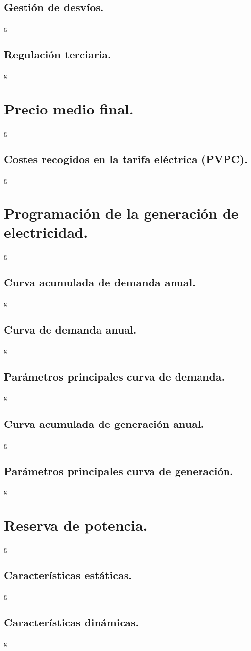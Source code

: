 \subsection{Gestión de desvíos.}
g
\subsection{Regulación terciaria.}
g
\section{Precio medio final.}
g
\subsection{Costes recogidos en la tarifa eléctrica (PVPC).}
g
\section{Programación de la generación de electricidad.}
g
\subsection{Curva acumulada de demanda anual.}
g
\subsection{Curva de demanda anual.}
g
\subsection{Parámetros principales curva de demanda.}
g
\subsection{Curva acumulada de generación anual.}
g
\subsection{Parámetros principales curva de generación.}
g
\section{Reserva de potencia.}
g
\subsection{Características estáticas.}
g
\subsection{Características dinámicas.}
g
